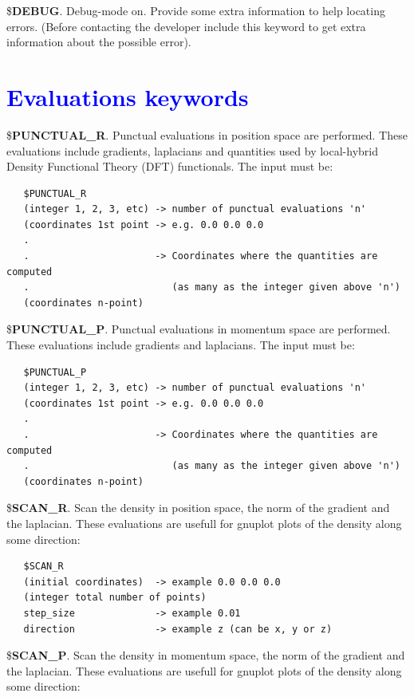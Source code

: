 \documentclass[10pt,a4paper]{article}
\newcommand{\tbl}[1]{{\textcolor{blue}{#1}}}
\begin{document}
\noindent \$\textbf{DEBUG}. Debug-mode on. Provide some extra information to help locating errors. (Before contacting the developer include this keyword to get extra information about the possible error).\newline

\section{\tbl{\textbf{Evaluations keywords}}}

\noindent \$\textbf{PUNCTUAL\_R}. Punctual evaluations in position space are performed. These evaluations include gradients, laplacians and quantities used by local-hybrid Density Functional Theory (DFT) functionals. The input must be:\newline
\begin{verbatim}
   $PUNCTUAL_R
   (integer 1, 2, 3, etc) -> number of punctual evaluations 'n'
   (coordinates 1st point -> e.g. 0.0 0.0 0.0 
   .
   .                      -> Coordinates where the quantities are computed  
   .                         (as many as the integer given above 'n')
   (coordinates n-point) 
\end{verbatim}
\noindent \$\textbf{PUNCTUAL\_P}. Punctual evaluations in momentum space are performed. These evaluations include gradients and laplacians. The input must be:\newline
\begin{verbatim}
   $PUNCTUAL_P
   (integer 1, 2, 3, etc) -> number of punctual evaluations 'n'
   (coordinates 1st point -> e.g. 0.0 0.0 0.0 
   .
   .                      -> Coordinates where the quantities are computed  
   .                         (as many as the integer given above 'n')
   (coordinates n-point) 
\end{verbatim}
\noindent \$\textbf{SCAN\_R}. Scan the density in position space, the norm of the gradient and the laplacian. These evaluations are usefull for gnuplot plots of the density along some direction:\newline
\begin{verbatim}
   $SCAN_R
   (initial coordinates)  -> example 0.0 0.0 0.0
   (integer total number of points)
   step_size              -> example 0.01
   direction              -> example z (can be x, y or z)
\end{verbatim}
\noindent \$\textbf{SCAN\_P}. Scan the density in momentum space, the norm of the gradient and the laplacian. These evaluations are usefull for gnuplot plots of the density along some direction:\newline
\end{document}
